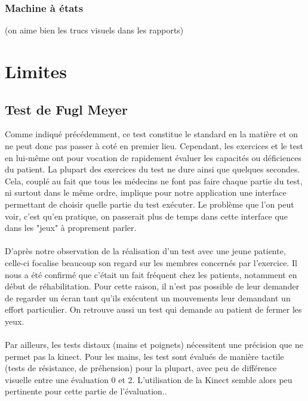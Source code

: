 \documentclass[french,12pt]{report}
\begin{document}
		\subsubsection{Machine à états }(on aime bien les trucs visuels dans les rapports)
		
		
		\section{Limites} \label{limites}%
			\subsection{Test de Fugl Meyer}
Comme indiqué précédemment, ce test constitue le standard en la matière et on ne peut donc pas passer à coté en premier lieu.
Cependant, les exercices et le test en lui-même ont pour vocation de rapidement évaluer les capacités ou déficiences
du patient. La plupart des exercices du test ne dure ainsi que quelques secondes. Cela, couplé au fait que tous les 
médecins ne font pas faire chaque partie du test, ni surtout dans le même ordre, implique pour notre application une interface permettant de choisir quelle partie du test exécuter. Le problème que l’on peut voir, c'est qu'en pratique, on passerait 
plus de temps dans cette interface que dans les "jeux" à proprement parler.

\paragraph{}
D'après notre observation de la réalisation d'un test avec une jeune patiente, celle-ci focalise 
beaucoup son regard sur les membres concernés par l'exercice. Il nous a été confirmé que c'était un fait fréquent
chez les patients, notamment en début de réhabilitation. Pour cette raison, il n'est pas possible de leur
demander de regarder un écran tant qu'ils exécutent un mouvements leur demandant un effort particulier.
On retrouve aussi un test qui demande au patient de fermer les yeux.

\paragraph{}
Par ailleurs, les tests distaux (mains et poignets) nécessitent une précision que ne permet pas la kinect.
Pour les mains, les test sont évalués de manière tactile (tests de résistance, de préhension) pour la plupart, 
avec peu de différence visuelle entre une évaluation 0 et 2. L’utilisation de la Kinect semble alors 
peu pertinente pour cette partie de l’évaluation..
\end{document}
